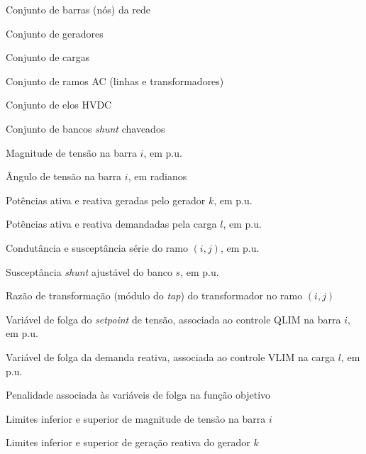 
\begin{simbolos} \itemsep -1pt
	\item[$ \mathcal{N} $] Conjunto de barras (nós) da rede
	\item[$ \mathcal{G} $] Conjunto de geradores
	\item[$ \mathcal{L} $] Conjunto de cargas
	\item[$ \mathcal{B} $] Conjunto de ramos AC (linhas e transformadores)
	\item[$ \mathcal{B}_{dc} $] Conjunto de elos HVDC
	\item[$ \mathcal{S} $] Conjunto de bancos \textit{shunt} chaveados
	\item[$ V_i $] Magnitude de tensão na barra $i$, em p.u.
	\item[$ \theta_i $] Ângulo de tensão na barra $i$, em radianos
	\item[$ p^g_k, q^g_k $] Potências ativa e reativa geradas pelo gerador $k$, em p.u.
	\item[$ p^d_l, q^d_l $] Potências ativa e reativa demandadas pela carga $l$, em p.u.
	\item[$ g_{ij}, b_{ij} $] Condutância e susceptância série do ramo $(i,j)$, em p.u.
	\item[$ b^{sh}_s $] Susceptância \textit{shunt} ajustável do banco $s$, em p.u.
	\item[$ t_{ij} $] Razão de transformação (módulo do \textit{tap}) do transformador no ramo $(i,j)$
	\item[$ s^v_i $] Variável de folga do \textit{setpoint} de tensão, associada ao controle QLIM na barra $i$, em p.u.
	\item[$ s^q_l $] Variável de folga da demanda reativa, associada ao controle VLIM na carga $l$, em p.u.
	\item[$ \rho $] Penalidade associada às variáveis de folga na função objetivo
	\item[$ V^{\min}_i, V^{\max}_i $] Limites inferior e superior de magnitude de tensão na barra $i$
	\item[$ q^{g,\min}_k, q^{g,\max}_k $] Limites inferior e superior de geração reativa do gerador $k$
\end{simbolos}
